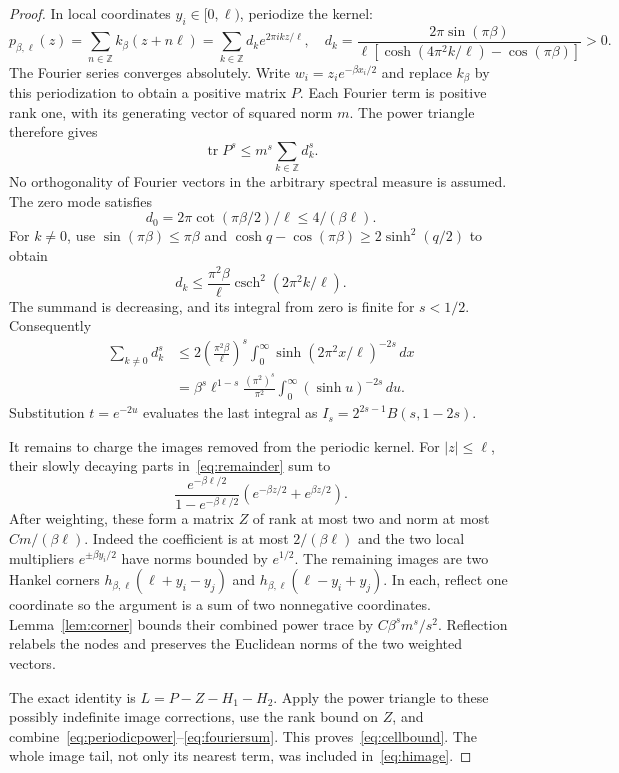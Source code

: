 \documentclass[11pt]{article}
\numberwithin{equation}{section}
\newcommand{\tr}{\operatorname{tr}}
\begin{document}
\begin{proof}
In local coordinates $y_i\in[0,\ell)$, periodize the kernel:
\[
 p_{\beta,\ell}(z)=\sum_{n\in\mathbb Z}k_\beta(z+n\ell)
       =\sum_{k\in\mathbb Z}d_k e^{2\pi ikz/\ell},
 \quad
 d_k=\frac{2\pi\sin(\pi\beta)}
 {\ell[\cosh(4\pi^2k/\ell)-\cos(\pi\beta)]}>0.
\]
The Fourier series converges absolutely. Write
$w_i=z_i e^{-\beta x_i/2}$ and replace $k_\beta$ by this
periodization to obtain a positive matrix $P$. Each Fourier term is
positive rank one, with its generating vector of squared norm $m$.
The power triangle therefore gives
\begin{equation}\label{eq:periodicpower}
 \tr P^s\le m^s\sum_{k\in\mathbb Z}d_k^s.
\end{equation}
No orthogonality of Fourier vectors in the arbitrary spectral
measure is assumed. The zero mode satisfies
\[
 d_0=2\pi\cot(\pi\beta/2)/\ell\le4/(\beta\ell).
\]
For $k\ne0$, use $\sin(\pi\beta)\le\pi\beta$ and
$\cosh q-\cos(\pi\beta)\ge2\sinh^2(q/2)$ to obtain
\[
 d_k\le\frac{\pi^2\beta}{\ell}
                  \operatorname{csch}^2(2\pi^2k/\ell).
\]
The summand is decreasing, and its integral from zero is finite for
$s<1/2$. Consequently
\begin{align}\label{eq:fouriersum}
 \sum_{k\ne0}d_k^s
 &\le 2\left(\frac{\pi^2\beta}{\ell}\right)^s
       \int_0^\infty\sinh(2\pi^2x/\ell)^{-2s}\,dx\nonumber\\
 &=\beta^s\ell^{1-s}\frac{(\pi^2)^s}{\pi^2}
                   \int_0^\infty(\sinh u)^{-2s}\,du.
\end{align}
Substitution $t=e^{-2u}$ evaluates the last integral as
$I_s=2^{2s-1}B(s,1-2s)$.

It remains to charge the images removed from the periodic kernel.
For $|z|\le\ell$, their slowly decaying parts in~\eqref{eq:remainder}
sum to
\[
 \frac{e^{-\beta\ell/2}}{1-e^{-\beta\ell/2}}
                         (e^{-\beta z/2}+e^{\beta z/2}).
\]
After weighting, these form a matrix $Z$ of rank at most two and
norm at most $Cm/(\beta\ell)$. Indeed the coefficient is at most
$2/(\beta\ell)$ and the two local multipliers
$e^{\pm\beta y_i/2}$ have norms bounded by $e^{1/2}$.
The remaining images are two Hankel corners
$h_{\beta,\ell}(\ell+y_i-y_j)$ and
$h_{\beta,\ell}(\ell-y_i+y_j)$. In each, reflect one coordinate so
the argument is a sum of two nonnegative coordinates.
Lemma~\ref{lem:corner} bounds their combined power trace by
$C\beta^sm^s/s^2$. Reflection relabels the nodes and preserves
the Euclidean norms of the two weighted vectors.

The exact identity is $L=P-Z-H_1-H_2$. Apply the power triangle to
these possibly indefinite image corrections, use the rank bound on
$Z$, and combine~\eqref{eq:periodicpower}--\eqref{eq:fouriersum}.
This proves~\eqref{eq:cellbound}. The whole image tail, not only
its nearest term, was included in~\eqref{eq:himage}.
\end{proof}
\end{document}
